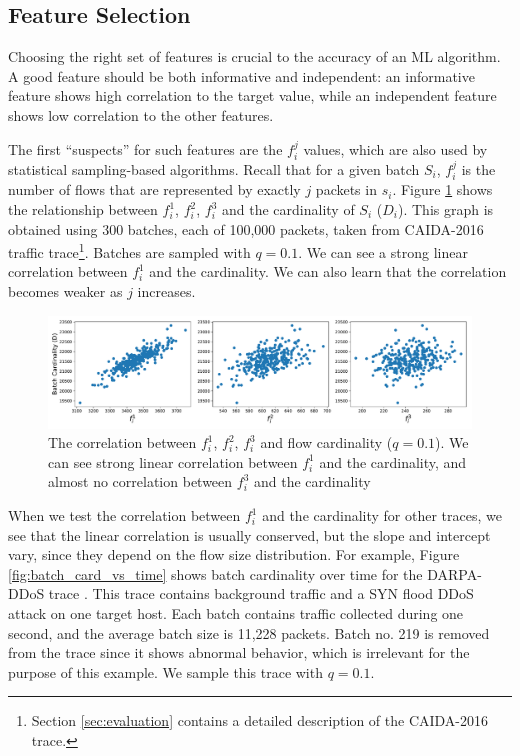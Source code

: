 	\subsection{Feature Selection} \label{subsec: feature_select}
	
		Choosing the right set of features is crucial to the accuracy of an ML algorithm. A good feature should be both informative and independent: an informative feature shows high correlation to the target value, while an independent feature shows low correlation to the other features.
		
		The first ``suspects'' for such features are the $f_i^j$ values, which are also used by statistical sampling-based algorithms. Recall that for a given batch $S_i$, $f_i^j$ is the number of flows that are represented by exactly $j$ packets in $s_i$. Figure \ref{fig:f_i_vs_card} shows the relationship between $f_i^1$, $f_i^2$, $f_i^3$ and the cardinality of $S_i$ ($D_i$). This graph is obtained using 300 batches, each of 100,000 packets, taken from CAIDA-2016 traffic trace\footnote{Section \ref{sec:evaluation} contains a detailed description of the CAIDA-2016 trace.}. Batches are sampled with $q=0.1$. We can see a strong linear correlation between $f_i^1$ and the cardinality. We can also learn that the correlation becomes weaker as $j$ increases.
		
		\begin{figure}[!t]
			\centering
			\includegraphics[width=.95\linewidth]{img/f_i_correlation_10.pdf}
			\caption{The correlation between $f_i^1$, $f_i^2$, $f_i^3$ and flow cardinality ($q=0.1$). We can see strong linear correlation between $f_i^1$ and the cardinality, and almost no correlation between $f_i^3$ and the cardinality}
			\label{fig:f_i_vs_card}
		\end{figure}

		When we test the correlation between $f_i^1$ and the cardinality for other traces, we see that the linear correlation is usually conserved, but the slope and intercept vary, since they depend on the flow size distribution. For example, Figure \ref{fig:batch_card_vs_time} shows batch cardinality over time for the DARPA-DDoS trace \cite{darpaddos}. This trace contains background traffic and a SYN flood DDoS attack on one target host. Each batch contains traffic collected during one second, and the average batch size is 11,228 packets. Batch no. 219 is removed from the trace since it shows abnormal behavior, which is irrelevant for the purpose of this example. We sample this trace with $q=0.1$.
		
